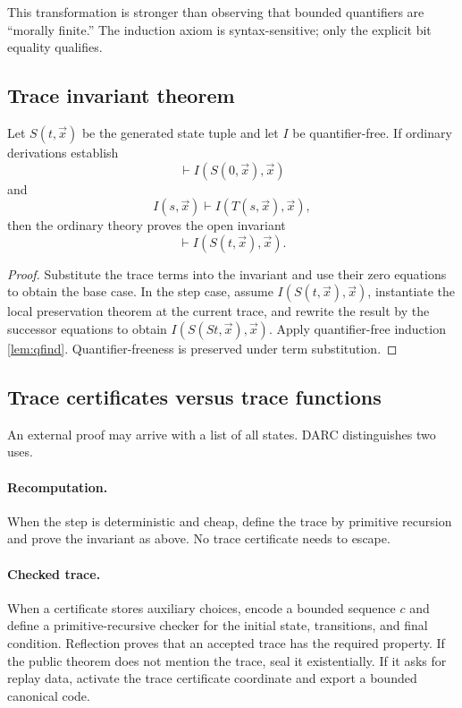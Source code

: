 This transformation is stronger than observing that bounded quantifiers are
``morally finite.''  The induction axiom is syntax-sensitive; only the
explicit bit equality qualifies.

\subsection{Trace invariant theorem}

\begin{theorem}
\label{thm:trace-reflection}
Let \(S(t,\vec x)\) be the generated state tuple and let \(I\) be
quantifier-free.  If ordinary derivations establish
\[
  \vdash I(S(0,\vec x),\vec x)
\]
and
\[
  I(s,\vec x)\vdash I(T(s,\vec x),\vec x),
\]
then the ordinary theory proves the open invariant
\[
  \vdash I(S(t,\vec x),\vec x).
\]
\end{theorem}

\begin{proof}
Substitute the trace terms into the invariant and use their zero equations to
obtain the base case.  In the step case, assume
\(I(S(t,\vec x),\vec x)\), instantiate the local preservation theorem at the
current trace, and rewrite the result by the successor equations to obtain
\(I(S(S t,\vec x),\vec x)\).  Apply quantifier-free induction
\cref{lem:qfind}.  Quantifier-freeness is preserved under term substitution.
\end{proof}

\subsection{Trace certificates versus trace functions}

An external proof may arrive with a list of all states.  DARC distinguishes two
uses.

\paragraph{Recomputation.}
When the step is deterministic and cheap, define the trace by primitive
recursion and prove the invariant as above.  No trace certificate needs to
escape.

\paragraph{Checked trace.}
When a certificate stores auxiliary choices, encode a bounded sequence
\(c\) and define a primitive-recursive checker for the initial state,
transitions, and final condition.  Reflection proves that an accepted trace
has the required property.  If the public theorem does not mention the trace,
seal it existentially.  If it asks for replay data, activate the trace
certificate coordinate and export a bounded canonical code.

